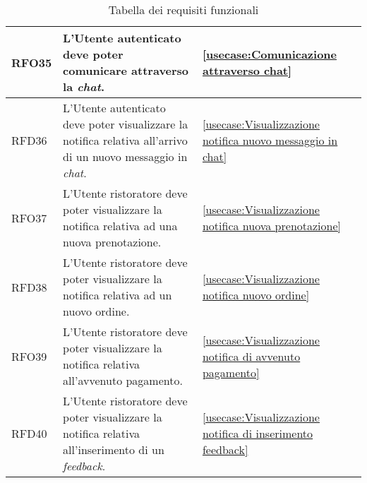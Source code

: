 \begin{table}[H]
\begin{tabularx}{\textwidth}{l|X|p{2cm}}
		\hline
		RFO35       & L'Utente autenticato deve poter comunicare attraverso la \textit{chat}.                                              & \autoref{usecase:Comunicazione attraverso chat}                                               \\
		\hline
		RFD36       & L'Utente autenticato deve poter visualizzare la notifica relativa all'arrivo di un nuovo messaggio in \textit{chat}. & \autoref{usecase:Visualizzazione notifica nuovo messaggio in chat}                            \\
		\hline
		RFO37       & L'Utente ristoratore deve poter visualizzare la notifica relativa ad una nuova prenotazione.                         & \autoref{usecase:Visualizzazione notifica nuova prenotazione}                                 \\
		\hline
		RFD38       & L'Utente ristoratore deve poter visualizzare la notifica relativa ad un nuovo ordine.                                & \autoref{usecase:Visualizzazione notifica nuovo ordine}                                       \\
		\hline
		RFO39       & L'Utente ristoratore deve poter visualizzare la notifica relativa all'avvenuto pagamento.                            & \autoref{usecase:Visualizzazione notifica di avvenuto pagamento}                              \\
		\hline
		RFD40       & L'Utente ristoratore deve poter visualizzare la notifica relativa all'inserimento di un \textit{feedback}.           & \autoref{usecase:Visualizzazione notifica di inserimento feedback}                            \\
	\end{tabularx}
	\caption{Tabella dei requisiti funzionali}
\end{table}


